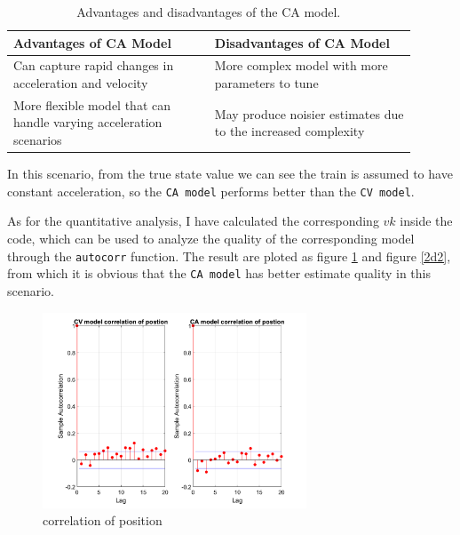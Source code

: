     \begin{table}[h]
        \centering
        \begin{tabular}{|p{0.45\linewidth}|p{0.45\linewidth}|}
        \hline
        \textbf{Advantages of CA Model} & \textbf{Disadvantages of CA Model} \\
        \hline
        Can capture rapid changes in acceleration and velocity & More complex model with more parameters to tune \\
        \hline
        More flexible model that can handle varying acceleration scenarios & May produce noisier estimates due to the increased complexity \\
        \hline
        \end{tabular}
        \caption{Advantages and disadvantages of the CA model.}
        \end{table}

In this scenario, from the true state value we can see the train is assumed to have constant acceleration, so the \texttt{CA model} performs better than the \texttt{CV model}. 

As for the quantitative analysis, I have calculated the corresponding $vk$ inside the code, which can be used to analyze the quality of the corresponding model through the \texttt{autocorr} function. The result are ploted as figure \ref{2d1} and figure \ref{2d2}, from which it is obvious that the \texttt{CA model} has better estimate quality in this scenario.

\begin{figure}[H]
 \centering
 \includegraphics[width=0.7\textwidth]{images/correlationofposition.png}
 \caption{correlation of position}
 \label{2d1}
\end{figure}

